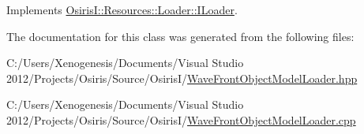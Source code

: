 Implements \hyperlink{class_osiris_i_1_1_resources_1_1_loader_1_1_i_loader_a70cfab0e4b095f8b0611fd929f9daed1}{Osiris\-I\-::\-Resources\-::\-Loader\-::\-I\-Loader}.



The documentation for this class was generated from the following files\-:\begin{DoxyCompactItemize}
\item 
C\-:/\-Users/\-Xenogenesis/\-Documents/\-Visual Studio 2012/\-Projects/\-Osiris/\-Source/\-Osiris\-I/\hyperlink{_wave_front_object_model_loader_8hpp}{Wave\-Front\-Object\-Model\-Loader.\-hpp}\item 
C\-:/\-Users/\-Xenogenesis/\-Documents/\-Visual Studio 2012/\-Projects/\-Osiris/\-Source/\-Osiris\-I/\hyperlink{_wave_front_object_model_loader_8cpp}{Wave\-Front\-Object\-Model\-Loader.\-cpp}\end{DoxyCompactItemize}
